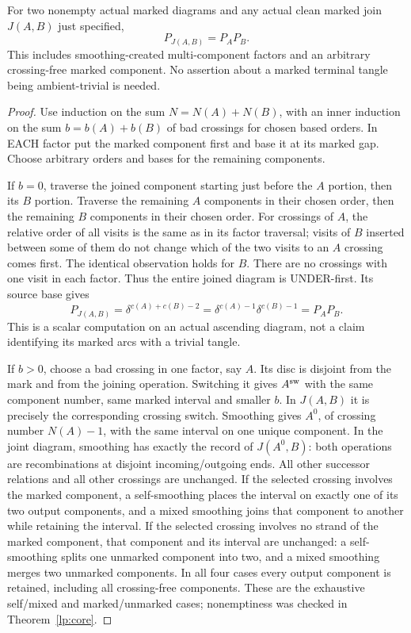 \begin{theorem}\label{mp:join}
For two nonempty actual marked diagrams and any actual clean marked
join $J(A,B)$ just specified,
\begin{equation}\label{mp:join-value}
 P_{J(A,B)}=P_AP_B.
\end{equation}
This includes smoothing-created multi-component factors and an arbitrary
crossing-free marked component. No assertion about a marked terminal
tangle being ambient-trivial is needed.
\end{theorem}
\begin{proof}
Use induction on the sum $N=N(A)+N(B)$, with an inner induction on the
sum $b=b(A)+b(B)$ of bad crossings for chosen based orders. In EACH
factor put the marked component first and base it at its marked gap.
Choose arbitrary orders and bases for the remaining components.

If $b=0$, traverse the joined component starting just before the $A$
portion, then its $B$ portion. Traverse the remaining $A$ components
in their chosen order, then the remaining $B$ components in their
chosen order. For crossings of $A$, the relative order of all visits is
the same as in its factor traversal; visits of $B$ inserted between
some of them do not change which of the two visits to an $A$ crossing
comes first. The identical observation holds for $B$. There are no
crossings with one visit in each factor. Thus the entire joined diagram
is UNDER-first. Its source base gives
\begin{equation}\label{mp:join-base}
 P_{J(A,B)}=\delta^{c(A)+c(B)-2}
             =\delta^{c(A)-1}\delta^{c(B)-1}=P_AP_B.
\end{equation}
This is a scalar computation on an actual ascending diagram, not a
claim identifying its marked arcs with a trivial tangle.

If $b>0$, choose a bad crossing in one factor, say $A$. Its disc is
disjoint from the mark and from the joining operation. Switching it
gives $A^{\rm sw}$ with the same component number, same marked interval
and smaller $b$. In $J(A,B)$ it is precisely the corresponding crossing
switch. Smoothing gives $A^0$, of crossing number $N(A)-1$, with the
same interval on one unique component. In the joint diagram, smoothing
has exactly the record of $J(A^0,B)$: both operations are recombinations
at disjoint incoming/outgoing ends. All other successor relations and
all other crossings are unchanged. If the selected crossing involves the marked component, a self-smoothing
places the interval on exactly one of its two output components, and a
mixed smoothing joins that component to another while retaining the
interval. If the selected crossing involves no strand of the marked
component, that component and its interval are unchanged: a self-smoothing
splits one unmarked component into two, and a mixed smoothing merges two
unmarked components. In all four cases every output component is retained,
including all crossing-free components. These are the exhaustive
self/mixed and marked/unmarked cases; nonemptiness was checked in
Theorem~\ref{lp:core}.


\end{proof}
